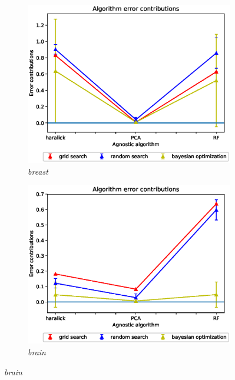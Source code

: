 \begin{figure}[ht!]
\centering
\begin{subfigure}{.5\textwidth}
  \centering
  \includegraphics[scale=0.37]{img/EP/agnostic_error_alg_breast.eps}
  \caption{\textit{breast}}
  \label{fig:eq_alg_breast}
\end{subfigure}%
\begin{subfigure}{.5\textwidth}
  \centering
  \includegraphics[scale=0.37]{img/EP/agnostic_error_alg_brain.eps}
  \caption{\textit{brain}}
  \label{fig:eq_alg_brain}

\end{subfigure}
\end{figure}
